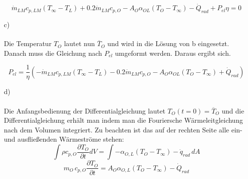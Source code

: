 \[\dot{m}_{LM} c_{p,LM} (T_\infty-T_L)+0.2\dot{m}_{LM} c_{p,O}-A_O \alpha_{OL}(T_O-T_\infty)-\dot{Q}_{rad}+P_{el}\eta=0\]
\bigskip 

\noindent c)  \\ 
\\ 
Die Temperatur \(T_O\) lautet nun \(\overline{T}_O\) und wird in die Lösung von b eingesetzt. Danach muss die Gleichung nach \(P_{el}\) umgeformt werden. Daraus ergibt sich. 

\[P_{el}=\frac{1}{\eta}\left(-\dot{m}_{LM} c_{p,LM} (T_\infty-T_L)-0.2\dot{m}_{LM} c_{p,O}-A_O \alpha_{OL}(T_O-T_\infty)+\dot{Q}_{rad}\right)\]

\bigskip 

\noindent d)  \\ 
\\
Die Anfangsbedienung der Differentialgleichung lautet \(T_O(t=0)=\overline{T}_O\) und die Differentialgleichung erhält man indem man die Fouriersche Wärmeleitgleichung nach dem Volumen integriert. Zu beachten ist das auf der rechten Seite alle ein- und ausfließenden Wärmeströme stehen: 
\[
\int \rho c_{p,O} \frac{\partial T_O}{\partial t} dV = \int -\alpha_{O,L}(T_O-T_\infty) - \dot{q}_{rad}\, dA
\]
\[
m_O\,c_{p,O} \frac{\partial T_O}{\partial t} = A_O \alpha_{O,L} (T_O-T_\infty) - \dot{Q}_{rad}
\]